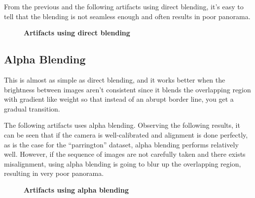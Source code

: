 \documentclass[a4paper]{article}
\begin{document}
From the previous and the following artifacts using direct blending, it's easy
to tell that the blending is not seamless enough and often results in poor panorama.

\begin{figure}[h]
  \centering
  \caption{\textbf{Artifacts using direct blending}}
  \label{fig:direct}
\end{figure}

\subsection{Alpha Blending}
This is almost as simple as direct blending, and it works better when the brightness
between images aren't consistent since it blends the overlapping region with gradient
like weight so that instead of an abrupt border line, you get a gradual transition.

The following artifacts uses alpha blending. Observing the following results, it
can be seen that if the camera is well-calibrated and alignment is done perfectly,
as is the case for the ``parrington'' dataset, alpha blending performs relatively
well. However, if the sequence of images are not carefully taken and there exists
misalignment, using alpha blending is going to blur up the overlapping region,
resulting in very poor panorama.

\begin{figure}[h]
  \centering
  \hfill
  \caption{\textbf{Artifacts using alpha blending}}
  \label{fig:alpha}
\end{figure}
\end{document}
